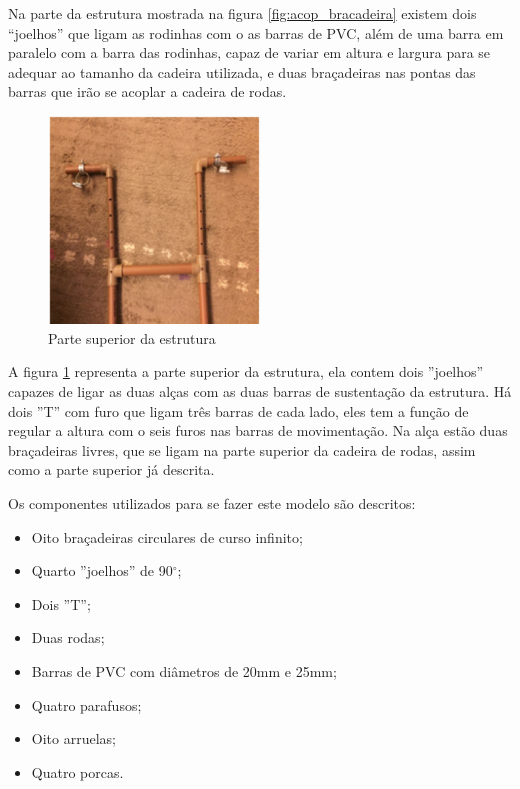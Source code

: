 Na parte da estrutura mostrada na figura \ref{fig:acop_bracadeira} existem dois “joelhos” que ligam as rodinhas com o as barras de PVC, além de uma barra em paralelo com a barra das rodinhas, capaz de variar em altura e largura para se adequar ao tamanho da cadeira utilizada, e  duas braçadeiras nas pontas das barras que irão se acoplar a cadeira de rodas.

\begin{figure}[!htb]
\centering
\includegraphics[width=0.5\textwidth]{figuras/resultados/superior_estrutura}
\caption{Parte superior da estrutura}
\label{fig:superior_estrutura}
\end{figure}

A figura \ref{fig:superior_estrutura} representa a parte superior da estrutura, ela contem dois ''joelhos'' capazes de ligar as duas alças com as duas barras de sustentação da estrutura. Há dois ''T'' com furo que ligam três barras de cada lado, eles tem a função de regular a altura com o seis furos nas barras de movimentação. Na alça estão duas braçadeiras livres, que se ligam na parte superior da cadeira de rodas, assim como a parte superior já descrita.

Os componentes utilizados para se fazer este modelo são descritos:
\begin{itemize}
  \item Oito braçadeiras circulares de curso infinito;
  \item Quarto ''joelhos'' de 90$^\circ$;
  \item Dois ''T'';
  \item Duas rodas;
  \item Barras de PVC com diâmetros de 20mm e 25mm;
  \item Quatro parafusos;
  \item Oito arruelas;
  \item Quatro porcas.
\end{itemize}

